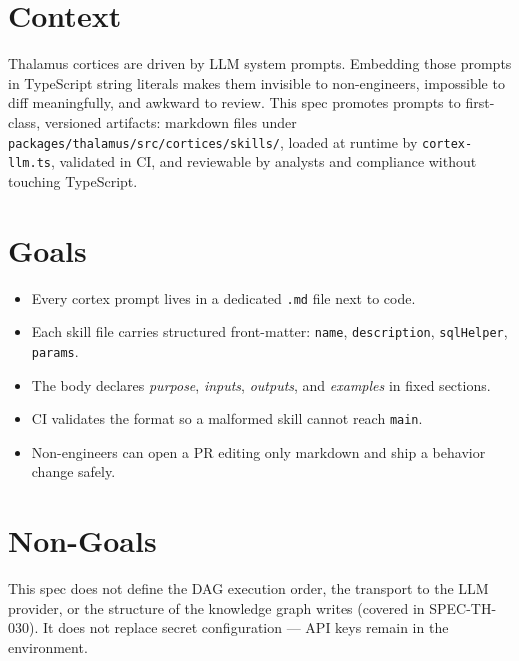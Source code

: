 




\makespecheader

\section{Context}
Thalamus cortices are driven by LLM system prompts. Embedding those prompts in TypeScript
string literals makes them invisible to non-engineers, impossible to diff meaningfully, and
awkward to review. This spec promotes prompts to first-class, versioned artifacts:
markdown files under \texttt{packages/thalamus/src/cortices/skills/}, loaded at runtime by
\texttt{cortex-llm.ts}, validated in CI, and reviewable by analysts and compliance without
touching TypeScript.

\section{Goals}
\begin{itemize}[leftmargin=1.2em]
  \item Every cortex prompt lives in a dedicated \texttt{.md} file next to code.
  \item Each skill file carries structured front-matter: \texttt{name}, \texttt{description},
        \texttt{sqlHelper}, \texttt{params}.
  \item The body declares \emph{purpose}, \emph{inputs}, \emph{outputs}, and
        \emph{examples} in fixed sections.
  \item CI validates the format so a malformed skill cannot reach \texttt{main}.
  \item Non-engineers can open a PR editing only markdown and ship a behavior change safely.
\end{itemize}

\section{Non-Goals}
\begin{nongoal}
This spec does not define the DAG execution order, the transport to the LLM provider, or
the structure of the knowledge graph writes (covered in SPEC-TH-030). It does not replace
secret configuration --- API keys remain in the environment.
\end{nongoal}


